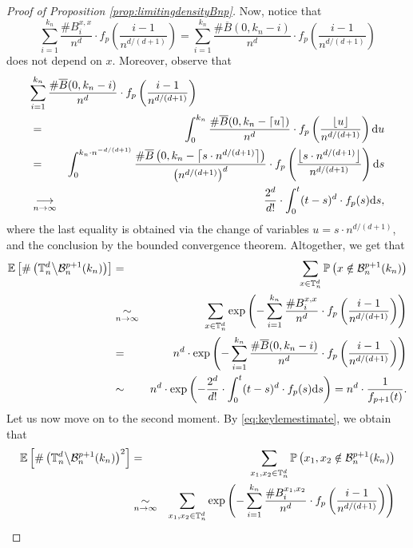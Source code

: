 \documentclass[a4paper,11pt]{article}
\begin{document}
\begin{proof}[Proof of Proposition \ref{prop:limitingdensityBnp}]
Now, notice that
\[\sum_{i=1}^{k_n}\frac{\#B_i^{x,x}}{n^d}\cdot f_p\left(\frac{i-1}{n^{d/(d+1)}}\right)=\sum_{i=1}^{k_n}\frac{\#\overline{B}(0,k_n-i)}{n^d}\cdot f_p\left(\frac{i-1}{n^{d/(d+1)}}\right)\]
does not depend on $x$.
Moreover, observe that
\begin{eqnarray}
\lefteqn{\sum_{i=1}^{k_n}\frac{\#\overline{B}(0,k_n-i)}{n^d}\cdot f_p\left(\frac{i-1}{n^{d/(d+1)}}\right)}\notag\\
&=&\int_0^{k_n}\frac{\#\overline{B}(0,k_n-\lceil u\rceil)}{n^d}\cdot f_p\left(\frac{\lfloor u\rfloor}{n^{d/(d+1)}}\right)\mathrm{d}u\notag\\
&=&\int_0^{k_n\cdot n^{-d/(d+1)}}\frac{\#\overline{B}\left(0,k_n-\left\lceil s\cdot n^{d/(d+1)}\right\rceil\right)}{\left(n^{d/(d+1)}\right)^d}\cdot f_p\left(\frac{\left\lfloor s\cdot n^{d/(d+1)}\right\rfloor}{n^{d/(d+1)}}\right)\mathrm{d}s\notag\\
&\underset{n\to\infty}{\longrightarrow}&\frac{2^d}{d!}\cdot\int_0^t(t-s)^d\cdot f_p(s)\mathrm{d}s\label{eq:untag},
\end{eqnarray}
where the last equality is obtained via the change of variables $u=s\cdot n^{d/(d+1)}$, and the conclusion by the bounded convergence theorem.
Altogether, we get that
\begin{eqnarray}
\mathbb{E}\left[\#\left(\mathbb{T}_n^d\middle\backslash\mathcal{B}_n^{p+1}(k_n)\right)\right]&=&\sum_{x\in\mathbb{T}_n^d}\mathbb{P}\left(x\notin\mathcal{B}_n^{p+1}(k_n)\right)\notag\\
&\underset{n\to\infty}{\sim}&\sum_{x\in\mathbb{T}_n^d}\exp\left(-\sum_{i=1}^{k_n}\frac{\#B_i^{x,x}}{n^d}\cdot f_p\left(\frac{i-1}{n^{d/(d+1)}}\right)\right)\notag\\
&=&n^d\cdot\exp\left(-\sum_{i=1}^{k_n}\frac{\#\overline{B}(0,k_n-i)}{n^d}\cdot f_p\left(\frac{i-1}{n^{d/(d+1)}}\right)\right)\label{eq:keylem1stmomentbis}\\
&\sim&n^d\cdot\exp\left(-\frac{2^d}{d!}\cdot\int_0^t(t-s)^d\cdot f_p(s)\mathrm{d}s\right)=n^d\cdot\frac{1}{f_{p+1}(t)}.\label{eq:keylem1stmoment}
\end{eqnarray}
Let us now move on to the second moment.
By \eqref{eq:keylemestimate}, we obtain that
\begin{eqnarray*}
\mathbb{E}\left[\#\left(\mathbb{T}_n^d\middle\backslash\mathcal{B}_n^{p+1}(k_n)\right)^2\right]&=&\sum_{x_1,x_2\in\mathbb{T}_n^d}\mathbb{P}\left(x_1,x_2\notin\mathcal{B}_n^{p+1}(k_n)\right)\\
&\underset{n\to\infty}{\sim}&\sum_{x_1,x_2\in\mathbb{T}_n^d}\exp\left(-\sum_{i=1}^{k_n}\frac{\#B_i^{x_1,x_2}}{n^d}\cdot f_p\left(\frac{i-1}{n^{d/(d+1)}}\right)\right)\\

\end{eqnarray*}
\end{proof}
\end{document}
